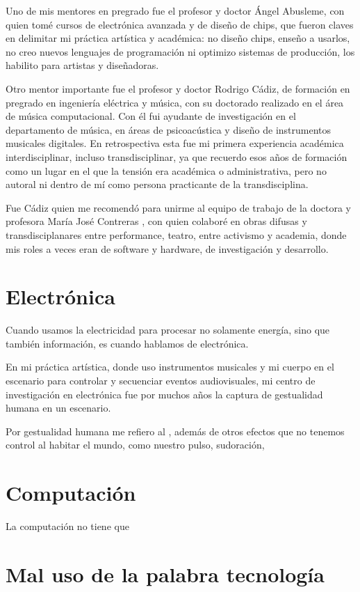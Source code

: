 \documentclass{article}
\begin{document}
Uno de mis mentores en pregrado fue el profesor y doctor Ángel Abusleme, con quien tomé cursos de electrónica avanzada y de diseño de chips, que fueron claves en delimitar mi práctica artística y académica: no diseño chips, enseño a usarlos, no creo nuevos lenguajes de programación ni optimizo sistemas de producción, los habilito para artistas y diseñadoras.

Otro mentor importante fue el profesor y doctor Rodrigo Cádiz, de formación en pregrado en ingeniería eléctrica y música, con su doctorado realizado en el área de música computacional. Con él fui ayudante de investigación en el departamento de música, en áreas de psicoacústica y diseño de instrumentos musicales digitales. En retrospectiva esta fue mi primera experiencia académica interdisciplinar, incluso transdisciplinar, ya que recuerdo esos años de formación como un lugar en el que la tensión era académica o administrativa, pero no autoral ni dentro de mí como persona practicante de la transdisciplina.

Fue Cádiz quien me recomendó para unirme al equipo de trabajo de la doctora y profesora María José Contreras \cite{mariaJoseContreras}, con quien colaboré en obras difusas y transdisciplanares entre performance, teatro, entre activismo y academia, donde mis roles a veces eran de software y hardware, de investigación y desarrollo.

\section{Electrónica}

Cuando usamos la electricidad para procesar no solamente energía, sino que también información, es cuando hablamos de electrónica.

En mi práctica artística, donde uso instrumentos musicales y mi cuerpo en el escenario para controlar y secuenciar eventos audiovisuales, mi centro de investigación en electrónica fue por muchos años la captura de gestualidad humana en un escenario.

Por gestualidad humana me refiero al , además de otros efectos que no tenemos control al habitar el mundo, como nuestro pulso, sudoración, 

\section{Computación}

La computación no tiene que 

\section{Mal uso de la palabra tecnología}
\end{document}
